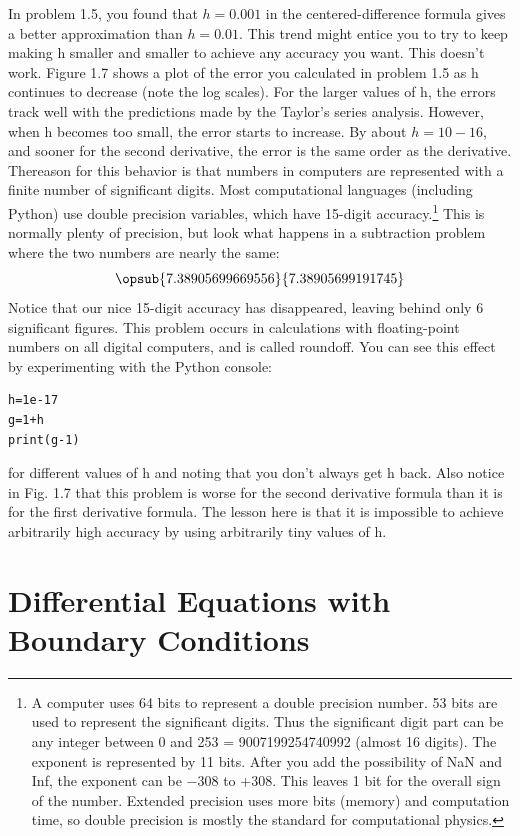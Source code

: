 \documentclass{book}
\theoremstyle{plain}
\theoremstyle{definition}
\numberwithin{exm}{chapter}
\theoremstyle{remark}
\theoremstyle{summary}
\theoremstyle{overview}
\begin{document}
In problem 1.5, you found that $h = 0.001$ in the centered-difference formula gives a better approximation than $h=0.01$. This trend might entice you to try to keep making h smaller and smaller to achieve any accuracy you want. This doesn\rq t work. Figure 1.7 shows a plot of the error you calculated in problem 1.5 as h continues to decrease (note the log scales). For the larger values of h, the errors track well with the predictions made by the Taylor\rq s series analysis. However, when h becomes too small, the error starts to increase. By about $h=10−16$, and sooner for the second derivative, the error is the same order as the derivative. Thereason for this behavior is that numbers in computers are represented with a finite number of significant digits. Most computational languages (including Python) use double precision variables, which have 15-digit accuracy.\footnote{A computer uses 64 bits to represent a double precision number. 53 bits are used to represent the significant digits. Thus the significant digit part can be any integer between 0 and 253 = 9007199254740992 (almost 16 digits). The exponent is represented by 11 bits. After you add the possibility of NaN and Inf, the exponent can be −308 to +308. This leaves 1 bit for the overall sign of the number. Extended precision uses more bits (memory) and computation time, so double precision is mostly the standard for computational physics.} This is normally plenty of precision, but look what happens in a subtraction problem where the two numbers are nearly the same:
\begin{equation} \label{eq:12}
\opsub{7.38905699669556}{7.38905699191745}
\end{equation}
Notice that our nice 15-digit accuracy has disappeared, leaving behind only 6 significant figures. This problem occurs in calculations with floating-point numbers on all digital computers, and is called roundoff. You can see this effect by experimenting with the Python console:
\begin{lstlisting}
h=1e-17
g=1+h
print(g-1)
\end{lstlisting}
for different values of h and noting that you don\rq t always get h back. Also notice in Fig. 1.7 that this problem is worse for the second derivative formula than it is for the first derivative formula. The lesson here is that it is impossible to achieve arbitrarily high accuracy by using arbitrarily tiny values of h.
\chapter*{Differential Equations with Boundary Conditions}
\end{document}
